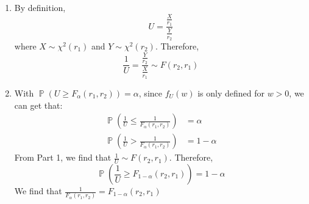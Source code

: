 \documentclass{huhtakm-template-book-v2}
\DeclareMathOperator{\prob}{\mathbb{P}}
\begin{document}
\begin{proofing}
	\begin{enumerate}
		\item By definition,
		\begin{equation*}
			U=\frac{\frac{X}{r_{1}}}{\frac{Y}{r_{2}}}
		\end{equation*}
		where $X\sim\chi^{2}(r_{1})$ and $Y\sim\chi^{2}(r_{2})$. Therefore,
		\begin{equation*}
			\frac{1}{U}=\frac{\frac{Y}{r_{2}}}{\frac{X}{r_{1}}}\sim F(r_{2},r_{1})
		\end{equation*}
		\item With $\prob(U\geq F_{\alpha}(r_{1},r_{2}))=\alpha$, since $f_{U}(w)$ is only defined for $w>0$, we can get that:
		\begin{align*}
			\prob\left(\frac{1}{U}\leq\frac{1}{F_{\alpha}(r_{1},r_{2})}\right)&=\alpha\\
			\prob\left(\frac{1}{U}>\frac{1}{F_{\alpha}(r_{1},r_{2})}\right)&=1-\alpha
		\end{align*}
		From Part 1, we find that $\frac{1}{U}\sim F(r_{2},r_{1})$. Therefore,
		\begin{equation*}
			\prob\left(\frac{1}{U}\geq F_{1-\alpha}(r_{2},r_{1})\right)=1-\alpha
		\end{equation*}
		We find that $\frac{1}{F_{\alpha}(r_{1},r_{2})}=F_{1-\alpha}(r_{2},r_{1})$
	\end{enumerate}
\end{proofing}
\end{document}
